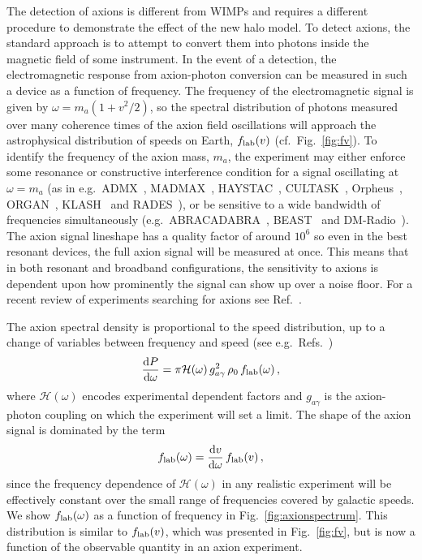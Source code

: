 \documentclass[prd,10pt,twocolumn,showpacs,nofootinbib, aps,superscriptaddress,preprintnumbers]{revtex4-1}
\begin{document}
The detection of axions is different from WIMPs and requires a different procedure to demonstrate the effect of the new halo model. To detect axions, the standard approach is to attempt to convert them into photons inside the magnetic field of some instrument.
In the event of a detection, the electromagnetic response from axion-photon conversion can be measured in such a device as a function of
frequency. The frequency of the electromagnetic signal is given by
$\omega = m_a(1+v^2/2)$, so the spectral distribution of photons
measured over many coherence times of the axion field oscillations will approach
the astrophysical distribution of speeds on Earth, $f_{\rm{lab}}(v)$ (cf.~Fig.~\ref{fig:fv}).
To identify the frequency of the axion mass, $m_a$, the experiment may either enforce some
resonance or constructive interference condition for a signal
oscillating at $\omega = m_a$
(as in e.g.~ADMX~\cite{Asztalos:2009yp,Du:2018uak},
MADMAX~\cite{TheMADMAXWorkingGroup:2016hpc,MADMAXinterestGroup:2017bgn,Millar:2016cjp},
HAYSTAC~\cite{Brubaker:2016ktl,Rapidis:2017ytq,Brubaker:2017rna,Zhong:2017fot,Brubaker:2018ebj},
CULTASK~\cite{Chung:2016ysi,Lee:2017mff,Chung:2017ibl},
Orpheus~\cite{Rybka:2014cya},
ORGAN~\cite{McAllister:2017lkb,McAllister:2017ern},
KLASH~\cite{Alesini:2017ifp} and RADES~\cite{Melcon:2018dba}), or be
sensitive to a wide bandwidth of frequencies simultaneously
(e.g.\ ABRACADABRA~\cite{Kahn:2016aff,Foster:2017hbq,Henning:2018ogd},
BEAST~\cite{McAllister:2018ndu} and
DM-Radio~\cite{Silva-Feaver:2016qhh}). The axion signal lineshape has
a quality factor of around $10^6$ so even in the best resonant devices,
the full axion signal will be measured at once. This means that in
both resonant and broadband configurations, the sensitivity to axions is
 dependent upon how prominently the signal can show up over a
noise floor. For a recent review of experiments searching for axions
see Ref.~\cite{Irastorza:2018dyq}.

The axion spectral density is proportional to the speed distribution,
up to a change of variables between frequency and speed (see
e.g.\ Refs.~\cite{OHare:2017yze,Foster:2017hbq})
%
\begin{equation}
\frac{\textrm{d}P}{\textrm{d}\omega} = \pi \mathcal{H}(\omega) \,g^2_{a\gamma} \,\rho_0 \, f_{\rm{lab}}(\omega) \, ,
\end{equation}
%
where $\mathcal{H}(\omega)$ encodes experimental dependent
factors and $g_{a\gamma}$ is the axion-photon coupling on which the
experiment will set a limit. The shape of the axion signal is dominated by the
term 
\begin{equation}
f_{\rm{lab}}(\omega) =\frac{\textrm{d}v}{\textrm{d}\omega}\, f_{\rm{lab}}(v)\, ,
\end{equation}
since the frequency dependence of $\mathcal{H}(\omega)$ in any realistic experiment will be effectively constant
over the small range of frequencies covered by galactic speeds.
We show $f_{\rm{lab}}(\omega)$ as a function of frequency in
Fig.~\ref{fig:axionspectrum}. This distribution is similar to $f_{\rm{lab}}(v)$, 
which was presented in Fig.~\ref{fig:fv}, 
but is now a function of the observable quantity in an axion experiment. 
\end{document}
